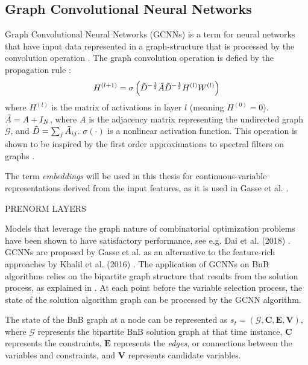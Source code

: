 \subsection{Graph Convolutional Neural Networks }

Graph Convolutional Neural Networks (\gls{GCNN}s) is a term for neural networks that have input data represented in a graph-structure that is processed by the convolution operation \cite{kipf2016semisupervised}. The graph convolution operation is defied by the propagation rule \cite{kipf2016semisupervised}:
\begin{equation}
    H^{(l+1)} = \sigma \left( \Tilde{D}^{-\frac{1}{2}} \Tilde{A} \Tilde{D}^{-\frac{1}{2}} H^{(l)}W^{(l)}\right)
\end{equation}
where $H^{(l)}$ is the matrix of activations in layer $l$ (meaning $H^{(0)} = 0$). $\Tilde{A} = A + I_N$, where $A$ is the adjacency matrix representing the undirected graph $\mathcal{G}$, and $\Tilde{D} = \sum_j \Tilde{A}_{i j}$. $\sigma( \cdot) $ is a nonlinear activation function.
This operation is shown to be inspired by the first order approximations to spectral filters on graphs \cite{kipf2016semisupervised}.

The term \textit{embeddings} will be used in this thesis for continuous-variable representations derived from the input features, as it is used in Gasse et al. \cite{gasse2019exact}. 


PRENORM LAYERS



Models that leverage the graph nature of combinatorial optimization problems have been shown to have satisfactory performance, see e.g. Dai et al. (2018) \cite{dai2018learning}. 
\gls{GCNN}s are proposed by Gasse et al. \cite{gasse2019exact} as an alternative to the feature-rich approaches by Khalil et al. (2016) \cite{khalil2016learning}. 
The application of \gls{GCNN}s on \gls{BnB} algorithms relies on the bipartite graph structure that results from the solution process, as explained in . At each point before the variable selection process, the state of the solution algorithm graph can be processed by the \gls{GCNN} algorithm. 

The state of the \gls{BnB} graph at a node can be represented as $s_t = (\mathcal{G}, \mathbf{C}, \mathbf{E}, \mathbf{V})$, where $\mathcal{G}$ represents the bipartite \gls{BnB} solution graph at that time instance, $\mathbf{C}$ represents the constraints, $\mathbf{E}$ represents the \textit{edges}, or connections between the variables and constraints, and $\mathbf{V}$ represents candidate variables.  

